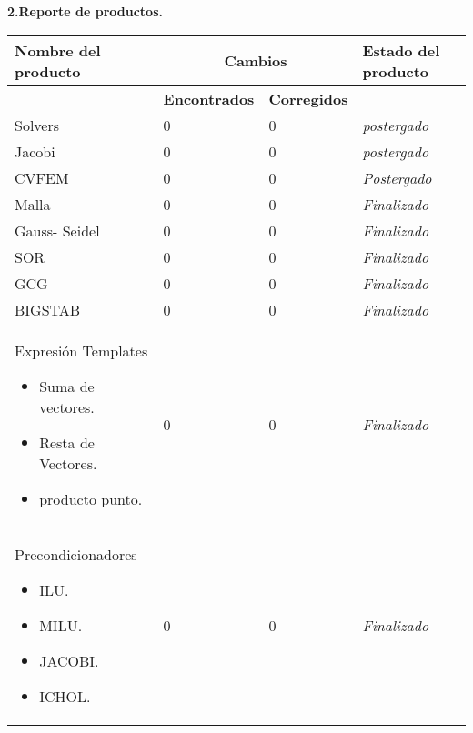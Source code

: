 \documentclass[12pt]{report}
\numberwithin{equation}{section}
\begin{document}
\begin{flushleft}

\textbf{2.Reporte de productos.}\\

\begin{table}[H]
\begin{tabular}{|m{4cm}|m{3cm}|m{3cm}|m{5cm}|}
\hline
\textbf{Nombre del producto} & \multicolumn{2}{c|}{\textbf{Cambios}}  
 & \textbf{Estado del producto}\\
 \hline
 & \textbf{Encontrados} &\textbf{Corregidos} & \\
\hline
\small{Solvers} & 0 & 0 &\scriptsize{\textit{postergado}} \\
\hline 
\small{Jacobi}& 0 & 0 & \scriptsize{\textit{{postergado}}} \\
\hline
\small{CVFEM}  & 0 & 0 &\scriptsize{\textit{Postergado}} \\
\hline
\small{Malla} & 0 & 0 &\scriptsize{\textit{Finalizado}} \\
\hline
\small{Gauss- Seidel} & 0 & 0 &\scriptsize{\textit{Finalizado}} \\
\hline
\small{SOR}& 0 & 0 &\scriptsize{\textit{Finalizado}} \\
\hline
\small{GCG}& 0 & 0 &\scriptsize{\textit{Finalizado}} \\
\hline
\small{BIGSTAB}& 0 & 0 &\scriptsize{\textit{Finalizado}} \\
\hline
\small{Expresión Templates \begin{itemize}
 \item Suma de vectores.
 \item Resta de Vectores.
 \item producto punto.
 \end{itemize}}& 0 & 0 &\scriptsize{\textit{Finalizado}} \\
\hline
\small{Precondicionadores \begin{itemize}
\item ILU.
\item MILU.
\item JACOBI.
\item ICHOL.
\end{itemize}}& 0 & 0 &\scriptsize{\textit{Finalizado}} \\
\hline
\end{tabular}
\label{tabla: TABLA Actividades CE }
\end{table}



\end{flushleft}
\end{document}
